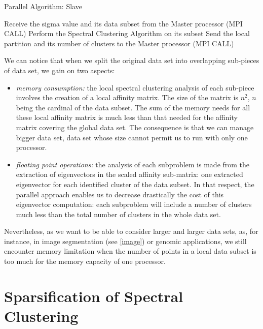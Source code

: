 \documentclass{llncs}
\begin{document}
\begin{algorithm}[!h]
\caption{Parallel Algorithm: Slave}
\label{algo-slave}
\begin{algorithmic}[1]
  \STATE Receive the sigma value and its data subset from the Master processor
         (MPI CALL)
  \STATE Perform the Spectral Clustering Algorithm on its subset
  \STATE Send the local partition and its number of clusters to the Master
         processor (MPI CALL)
\end{algorithmic}
\end{algorithm}

We can notice that when we split the original data set into overlapping
sub-pieces of data set, we gain on two aspects:
\begin{itemize}
\item {\it memory consumption:} the local spectral clustering analysis of each
      sub-piece involves the creation of a local affinity matrix.
      The size of the matrix is $n^2$, $n$ being the cardinal of the data
      subset. The sum of the memory needs for all these local affinity matrix
      is much less than that needed for the affinity matrix covering the
      global data set.
      The consequence is that we can manage bigger data set, data set whose
      size cannot permit us to run with only one processor.
\item {\it floating point operations:} the analysis of each subproblem is made from
      the extraction of eigenvectors in the scaled affinity sub-matrix: one
      extracted eigenvector for each identified cluster of the data subset.
      In that respect, the parallel approach enables us to decrease
      drastically the cost of this eigenvector computation: each subproblem
      will include a number of clusters much less than the total
      number of clusters in the whole data set.
\end{itemize}

Nevertheless, as we want to be able to consider larger and larger data sets,
as, for instance, in image segmentation (see \ref{image}) or genomic
applications, we still encounter memory limitation when the number of points
in a local data subset is too much for the memory capacity of one processor.

\section{Sparsification of Spectral Clustering}
\end{document}
